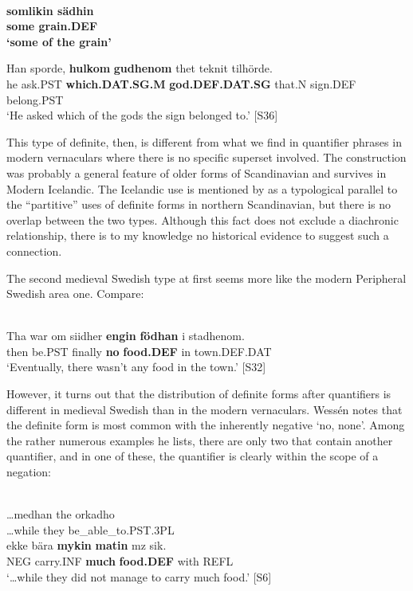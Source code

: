 \ea\label{}
\\
\gll\bfseries
somlikin  sädhin\\
\bfseries
some  grain.DEF\\
\glt ‘some of the grain’

\z

\ea
\gll Han  sporde,  \textbf{hulkom} \textbf{gudhenom} thet  teknit  tilhörde.\\
he  ask.PST  \textbf{which.DAT.SG.M} \textbf{god.DEF.DAT.SG} that.N  sign.DEF  belong.PST\\
\glt ‘He asked which of the gods the sign belonged to.’ [S36]

\z

This type of definite, then, is different from what we find in quantifier phrases in modern vernaculars where there is no specific superset involved. The construction was probably a general feature of older forms of Scandinavian and survives in Modern Icelandic. The Icelandic use is mentioned by \citet{Riesler2002} as a typological parallel to the “partitive” uses of definite forms in northern Scandinavian, but there is no overlap between the two types. Although this fact does not exclude a diachronic relationship, there is to my knowledge no historical evidence to suggest such a connection.

The second medieval Swedish type at first seems more like the modern Peripheral Swedish area one. Compare:

\ea \label{} 
\\
\gll Tha  war  om siidher  \textbf{engin} \textbf{födhan} i  stadhenom.\\
then  be.PST  finally  \textbf{no} \textbf{food.DEF} in  town.DEF.DAT\\
\glt ‘Eventually, there wasn’t any food in the town.’ [S32]

\z

However, it turns out that the distribution of definite forms after quantifiers is different in medieval Swedish than in the modern vernaculars. Wessén notes that the definite form is most common with the inherently negative  ‘no, none’. Among the rather numerous examples he lists, there are only two that contain another quantifier, and in one of these, the quantifier is clearly within the scope of a negation: 

\ea \label{} 
\\
\gll …medhan  the  orkadho\\
…while  they  be\_able\_to.PST.3PL\\
\gll ekke  bära  \textbf{mykin} \textbf{  matin} mz  sik.\\
NEG  carry.INF  \textbf{much} \textbf{food.DEF} with  REFL\\
\glt  ‘…while they did not manage to carry much food.’ [S6]

